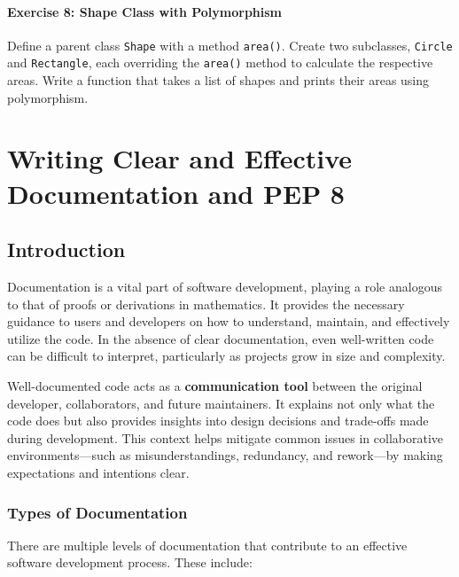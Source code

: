 \documentclass[
  letterpaper,
  DIV=11,
  numbers=noendperiod]{scrreprt}
\begin{document}
\hypertarget{exercise-8-shape-class-with-polymorphism}{%
\subsubsection{Exercise 8: Shape Class with
Polymorphism}\label{exercise-8-shape-class-with-polymorphism}}

Define a parent class \texttt{Shape} with a method \texttt{area()}.
Create two subclasses, \texttt{Circle} and \texttt{Rectangle}, each
overriding the \texttt{area()} method to calculate the respective areas.
Write a function that takes a list of shapes and prints their areas
using polymorphism.


\hypertarget{sec-doc}{%
\chapter{Writing Clear and Effective Documentation and PEP
8}\label{sec-doc}}

\hypertarget{introduction-1}{%
\section{Introduction}\label{introduction-1}}

Documentation is a vital part of software development, playing a role
analogous to that of proofs or derivations in mathematics. It provides
the necessary guidance to users and developers on how to understand,
maintain, and effectively utilize the code. In the absence of clear
documentation, even well-written code can be difficult to interpret,
particularly as projects grow in size and complexity.

Well-documented code acts as a \textbf{communication tool} between the
original developer, collaborators, and future maintainers. It explains
not only what the code does but also provides insights into design
decisions and trade-offs made during development. This context helps
mitigate common issues in collaborative environments---such as
misunderstandings, redundancy, and rework---by making expectations and
intentions clear.

\hypertarget{types-of-documentation}{%
\subsection{Types of Documentation}\label{types-of-documentation}}

There are multiple levels of documentation that contribute to an
effective software development process. These include:
\end{document}
